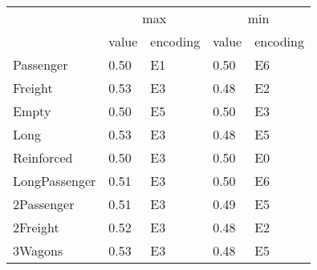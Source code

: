 \begin{tabular}{lllll}
\toprule
 & \multicolumn{2}{c}{max} & \multicolumn{2}{c}{min} \\
 & value & encoding & value & encoding \\
\midrule
Passenger & 0.50 & E1 & 0.50 & E6 \\
Freight & 0.53 & E3 & 0.48 & E2 \\
Empty & 0.50 & E5 & 0.50 & E3 \\
Long & 0.53 & E3 & 0.48 & E5 \\
Reinforced & 0.50 & E3 & 0.50 & E0 \\
LongPassenger & 0.51 & E3 & 0.50 & E6 \\
2Passenger & 0.51 & E3 & 0.49 & E5 \\
2Freight & 0.52 & E3 & 0.48 & E2 \\
3Wagons & 0.53 & E3 & 0.48 & E5 \\
\bottomrule
\end{tabular}
